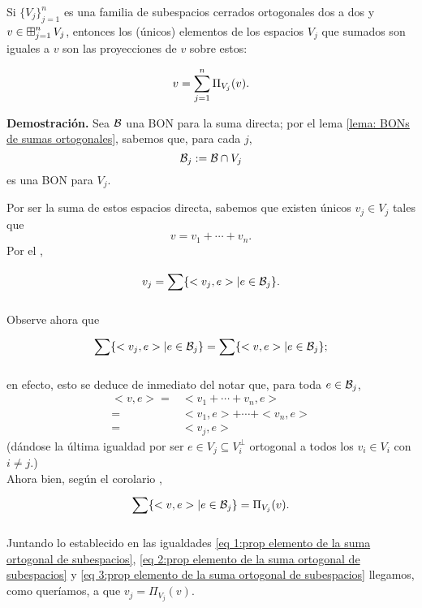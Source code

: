 \QEDB
\vspace{0.2cm}


\begin{prop} \label{prop: elemento de la suma ortogonal de subespacios}
Si $\{ V_{j} \}_{j=1}^{n}$ es una familia de subespacios 
cerrados
ortogonales dos a dos
y $v \in \operatorname*{{\boxplus}}_{j =1 }^{n} V_{j}$, entonces los (únicos) elementos
de los espacios $V_{j}$ que sumados son iguales a $v$
son las proyecciones de $v$ sobre estos:

\[
v = \sum\limits_{j=1}^{n} \Pi_{V_{j}}(v).
\]
\end{prop}
\noindent
\textbf{Demostración.}
Sea $\mathcal{B}$ una BON para la suma directa; por el lema 
\ref{lema: BONs de sumas ortogonales}, sabemos que,
para cada $j$,
\[
\mathcal{B}_{j}:= \mathcal{B} \cap V_{j}
\]
es una BON para $V_{j}$.

Por ser la suma de estos espacios directa, sabemos
que existen únicos $v_{j} \in V_{j}$ tales que
\[
v=v_{1} + \cdots + v_{n}.
\]
Por el ,

\begin{equation}
\label{eq 1:prop elemento de la suma ortogonal de subespacios}
v_{j}= \sum\limits_{}^{}\{ <v_{j},e> | e \in \mathcal{B}_{j}  \}.
\end{equation}


Observe ahora que
\begin{equation}
\label{eq 2:prop elemento de la suma ortogonal de subespacios}
\sum\limits_{}^{}\{ <v_{j},e> | e \in \mathcal{B}_{j}  \}=
\sum\limits_{}^{}\{ <v,e> | e \in \mathcal{B}_{j}  \};
\end{equation}

en efecto, 
esto se deduce de inmediato del notar que,
para toda $e \in \mathcal{B}_{j}$,
\begin{align*}
<v, e> = & <v_{1} + \cdots + v_{n}, e> \\
= & <v_{1}, e> + \cdots + <v_{n}, e> \\
= & <v_{j}, e> 
\end{align*}
(dándose la última igualdad por ser $e \in V_{j} \subseteq V_{i}^{\perp}$
ortogonal a todos los $v_{i} \in V_{i}$ con $i \neq j$.) \\

Ahora bien, según el corolario ,
\begin{equation}
\label{eq 3:prop elemento de la suma ortogonal de subespacios}
\sum\limits_{}^{}\{ <v,e> | e \in \mathcal{B}_{j}  \}= \Pi_{V_{j}}(v).
\end{equation}

Juntando lo establecido en las igualdades
\eqref{eq 1:prop elemento de la suma ortogonal de subespacios},
\eqref{eq 2:prop elemento de la suma ortogonal de subespacios} y
\eqref{eq 3:prop elemento de la suma ortogonal de subespacios}
llegamos, como queríamos, a que
$v_{j}= \Pi_{V_{j}}(v).$

